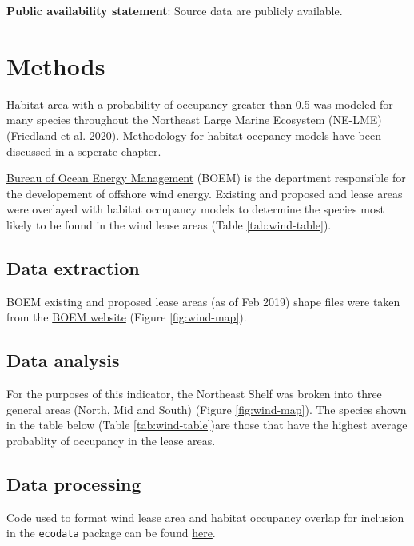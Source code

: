 \documentclass[
]{book}
\begin{document}
\textbf{Public availability statement}: Source data are publicly available.

\hypertarget{methods-44}{%
\section{Methods}\label{methods-44}}

Habitat area with a probability of occupancy greater than 0.5 was modeled for many species throughout the Northeast Large Marine Ecosystem (NE-LME) (Friedland et al. \protect\hyperlink{ref-friedland2020}{2020}). Methodology for habitat occpancy models have been discussed in a \protect\hyperlink{hab-occu}{seperate chapter}.

\href{https://www.boem.gov/}{Bureau of Ocean Energy Management} (BOEM) is the department responsible for the developement of offshore wind energy. Existing and proposed and lease areas were overlayed with habitat occupancy models to determine the species most likely to be found in the wind lease areas (Table \ref{tab:wind-table}).

\hypertarget{data-extraction-35}{%
\subsection{Data extraction}\label{data-extraction-35}}

BOEM existing and proposed lease areas (as of Feb 2019) shape files were taken from the \href{https://www.boem.gov/renewable-energy/mapping-and-data/renewable-energy-gis-data}{BOEM website} (Figure \ref{fig:wind-map}).

\hypertarget{data-analysis-42}{%
\subsection{Data analysis}\label{data-analysis-42}}

For the purposes of this indicator, the Northeast Shelf was broken into three general areas (North, Mid and South) (Figure \ref{fig:wind-map}). The species shown in the table below (Table \ref{tab:wind-table})are those that have the highest average probablity of occupancy in the lease areas.

\hypertarget{data-processing-30}{%
\subsection{Data processing}\label{data-processing-30}}

Code used to format wind lease area and habitat occupancy overlap for inclusion in the \texttt{ecodata} package can be found \href{https://github.com/NOAA-EDAB/ecodata/blob/master/data-raw/get_wind_occupancy.R}{here}.
\end{document}
